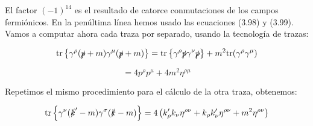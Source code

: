 El factor $(-1)^{14}$ es el resultado de catorce conmutaciones de los campos fermiónicos. En la penúltima línea hemos usado las ecuaciones (3.98) y (3.99). Vamos a computar ahora cada traza por separado, usando la tecnología de trazas:

\begin{equation}
\text{tr} \left\{ \gamma^\rho (\slashed{p} + m) \gamma^\mu (\slashed{p} + m) \right\} = \text{tr} \left\{ \gamma^\rho \slashed{p} \gamma^\nu \slashed{p} \right\} + m^2 \text{tr}(\gamma^\rho \gamma^\mu)
\end{equation}

\begin{equation}
= 4p^\rho p^\mu + 4m^2 \eta^{\rho\mu}
\end{equation}

Repetimos el mismo procedimiento para el cálculo de la otra traza, obtenemos:

\begin{equation}
\text{tr} \left\{ \gamma^\nu (\slashed{k}' - m) \gamma^\sigma (\slashed{k} - m) \right\} = 4 \left( k'_\rho k_\nu \eta^{\rho\nu} + k_\rho k'_\nu \eta^{\rho\nu} + m^2 \eta^{\rho\nu} \right)
\end{equation}


